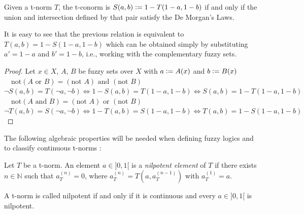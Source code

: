 \begin{proposition}
  Given a t-norm $T$, the t-conorm is $S(a,b)\mathrel{\mathop:}= 1 - T(1-a, 1-b)$ if and only if the union and intersection defined by that pair satisfy the De Morgan's Laws.
\end{proposition}
\begin{remark}
  It is easy to see that the previous relation is equivalent to $T(a,b) = 1-S(1-a, 1-b)$ which can be obtained simply by substituting $a'=1-a$ and $b'=1-b$, i.e., working with the complementary fuzzy sets.
\end{remark}

\begin{proof}
  Let $x\in X$, $A$, $B$ be fuzzy sets over $X$ with $a \mathrel{\mathop:}= A(x)$ and $b \mathrel{\mathop:}= B(x)$\\

  $\quad \boxed{\text{not}(A \text{ or } B) = (\text{not } A) \text{ and } (\text{not } B)}$\\
  [0.5em]
  $\lnot S(a,b) = T(\lnot a, \lnot b) \iff 1 - S(a,b) = T(1-a, 1-b) \iff S(a,b) = 1 - T(1-a, 1-b)$\\

  $\quad \boxed{\text{not}(A \text{ and } B) = (\text{not } A) \text{ or } (\text{not } B)}$\\
  [0.5em]
  $\lnot T(a,b) = S(\lnot a, \lnot b) \iff 1 - T(a,b) = S(1-a, 1-b) \iff T(a,b) = 1 - S(1-a, 1-b)$

\end{proof}






The following algebraic properties will be needed when defining fuzzy logics and to classify continuous t-norms \cite[Def.~2.1 \& 2.13]{Klement2000}:

\begin{definition}
Let $T$ be a t-norm. An element $a \in ]0,1[$ is a \emph{nilpotent element} of $T$ if there exists $n \in \mathbb{N}$ such that $a_T^{(n)} = 0$, where $a_T^{(n)} = T(a, a_T^{(n-1)})$ with $a_T^{(1)}=a$.

A t-norm is called nilpotent if and only if it is continuous and every $a\in ]0,1[$ is nilpotent.
\end{definition}


